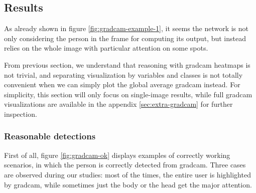 \subsection{Results}
\label{subsec:gradcam-results}

As already shown in figure \ref{fig:gradcam-example-1}, it seems the network is not only considering the person in the frame for computing its output, but instead relies on the whole image with particular attention on some spots.

From previous section, we understand that reasoning with \gls{gradcam} heatmaps is not trivial, and separating visualization by variables and classes is not totally convenient when we can simply plot the global average \gls{gradcam} instead. For simplicity, this section will only focus on single-image results, while full \gls{gradcam} visualizations are available in the appendix \ref{sec:extra-gradcam} for further inspection.

\subsubsection*{Reasonable detections}

First of all, figure \ref{fig:gradcam-ok} displays examples of correctly working scenarios, in which the person is correctly detected from \gls{gradcam}. Three cases are observed during our studies: most of the times, the entire user is highlighted by \gls{gradcam}, while sometimes just the body or the head get the major attention.

